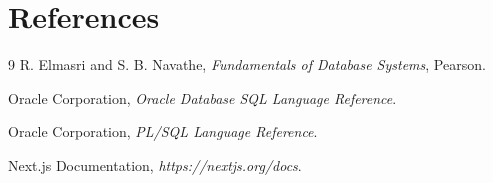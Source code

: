 \documentclass[12pt,a4paper]{report}
\begin{document}
\chapter{References}
\begin{thebibliography}{9}
R. Elmasri and S. B. Navathe, \textit{Fundamentals of Database Systems}, Pearson.

Oracle Corporation, \textit{Oracle Database SQL Language Reference}.

Oracle Corporation, \textit{PL/SQL Language Reference}.

Next.js Documentation, \textit{https://nextjs.org/docs}.
\end{thebibliography}
\end{document}
